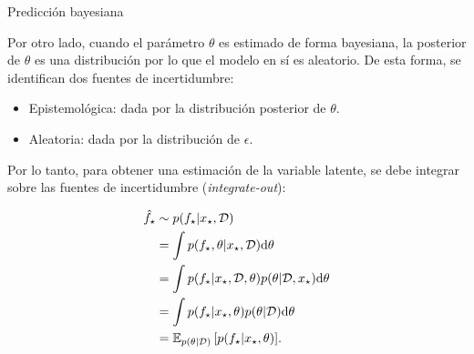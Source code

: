 \documentclass[9pt, handout]{beamer}
\begin{document}
\begin{frame}{Predicción bayesiana}

Por otro lado, cuando el parámetro $\theta$ es estimado de forma bayesiana, la posterior de $\theta$ es una distribución por lo que el modelo en sí es aleatorio. \pause De esta forma, se identifican dos fuentes de incertidumbre:

\begin{itemize}
	\item Epistemológica: dada por la distribución posterior de $\theta$.\pause
	\item Aleatoria: dada por la distribución de $\epsilon$.\pause
\end{itemize}
\vspace{1em}
Por lo tanto, para obtener una estimación de la variable latente, se debe integrar sobre las fuentes de incertidumbre (\emph{integrate-out}):

\begin{align*}
	\hat f_\star &\sim p(f_\star|x_\star,{\mathcal D}) \\
	&= \int p(f_\star, \theta|x_\star,{\mathcal D}){\text d}\theta \\
	&= \int p(f_\star|x_\star, {\mathcal D}, \theta)p( \theta|{\mathcal D},x_\star){\text d}\theta \\
	&= \int p(f_\star|x_\star, \theta)p( \theta|{\mathcal D}){\text d}\theta\\
	&= \operatorname{\mathbb{E}}_{p( \theta|{\mathcal D})}{[p(f_\star|x_\star, \theta)]}.
\end{align*}
	
\end{frame}
\end{document}

